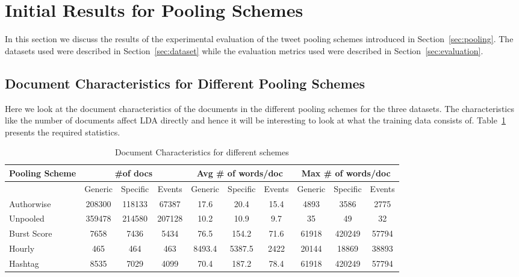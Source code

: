 \documentclass[10pt,a5paper,twoside]{article}
\begin{document}
\section{Initial Results for Pooling Schemes}

In this section we discuss the results of the experimental evaluation
of the tweet pooling schemes introduced in
Section~\ref{sec:pooling}. The datasets used were described in
Section~\ref{sec:dataset} while the evaluation metrics used were
described in Section~\ref{sec:evaluation}.

\label{sec:init_results}

\subsection{Document Characteristics for Different Pooling Schemes}

Here we look at the document characteristics of the documents in the
different pooling schemes for the three datasets. The characteristics
like the number of documents affect LDA directly and hence it will be
interesting to look at what the training data consists
of. Table~\ref{tbl-3} presents the required statistics.

\begin{table}[!h]
\centering
\resizebox{14cm}{!} 
{
	\begin{tabular}{|l|ccc|ccc|ccc|}
	\hline
	Pooling Scheme  & \multicolumn {3}{c}{\#of docs} & \multicolumn {3}{c}{Avg \# of words/doc} & \multicolumn {3}{c|}{Max \# of words/doc}\\
	\hline
	 & Generic & Specific & Events &  Generic & Specific & Events &  Generic & Specific & Events\\
	\hline
	Authorwise & 208300 & 118133 & 67387 & 17.6 & 20.4 & 15.4 & 4893 & 3586 & 2775 \\
	\hline
	Unpooled & 359478 & 214580 & 207128 & 10.2 & 10.9 & 9.7 & 35 & 49 & 32 \\
	\hline
	Burst Score & 7658 & 7436 & 5434 & 76.5 & 154.2 & 71.6 & 61918 & 420249 & 57794 \\
	\hline
	Hourly & 465 & 464 & 463 & 8493.4 & 5387.5 & 2422 & 20144 & 18869 & 38893 \\
	\hline
	Hashtag & 8535 & 7029 & 4099 & 70.4 & 187.2 & 78.4 & 61918 & 420249 & 57794 \\
	\hline
	\end{tabular}
}
\caption{Document Characteristics for different schemes}\label{tbl-3}
\end{table}
\end{document}
